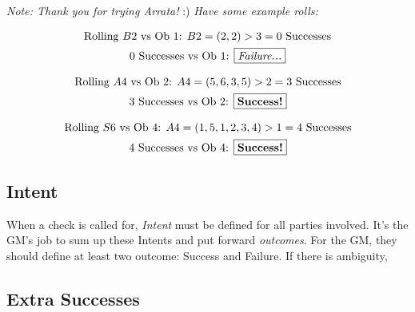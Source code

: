 \documentclass[../main.tex]{subfiles}
\begin{document}
    \emph{Note: Thank you for trying Arrata!} :) \emph{Have some example rolls:}
    \\
    \begin{mdframed}[style=Arrata]
        \begin{equation*}
            \begin{gathered}
                \text{Rolling $B2$ vs Ob 1: }                      
                B2 = (2, 2)>3 = 0 \text{ Successes}               \\
                \text{0 Successes vs Ob 1: \boxed{\emph{Failure...}}}
            \end{gathered}
        \end{equation*}

        \begin{equation*}
            \begin{gathered}
                \text{Rolling $A4$ vs Ob 2: }                      
                A4 = (5, 6, 3, 5)>2 = 3 \text{ Successes}         \\
                \text{3 Successes vs Ob 2: \boxed{\textbf{Success!}}}
            \end{gathered}
        \end{equation*}

        \begin{equation*}
            \begin{gathered}
                \text{Rolling $S6$ vs Ob 4: }                      
                A4 = (1, 5, 1, 2, 3, 4)>1 = 4 \text{ Successes}   \\
                \text{4 Successes vs Ob 4: \boxed{\textbf{Success!}}}
            \end{gathered}
        \end{equation*}
    \end{mdframed}

    \subsection{Intent}

    When a check is called for, \emph{Intent} must be defined for all parties involved. It's the GM's job to sum up these Intents and put forward \emph{outcomes}. For the GM, they should define at least two outcome: Success and Failure. If there is ambiguity, 

    \subsection{Extra Successes}
\end{document}
